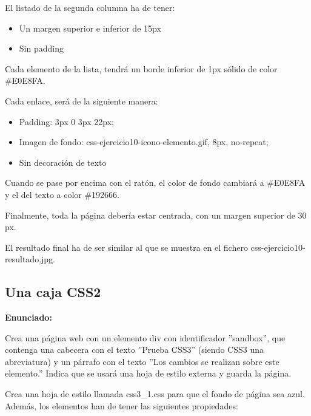 El listado de la segunda columna ha de tener:
\begin{itemize}
  \item Un margen superior e inferior de 15px
  \item Sin padding
\end{itemize}

Cada elemento de la lista, tendrá un borde inferior de 1px sólido de color \#E0E8FA.

Cada enlace, será de la siguiente manera:

\begin{itemize}
  \item Padding: 3px 0 3px 22px;
  \item Imagen de fondo: css-ejercicio10-icono-elemento.gif, 8px, no-repeat;
  \item Sin decoración de texto
\end{itemize}

Cuando se pase por encima con el ratón, el color de fondo cambiará a \#E0E8FA y el del texto a color \#192666.

Finalmente, toda la página debería estar centrada, con un margen superior de 30 px.

El resultado final ha de ser similar al que se muestra en el fichero css-ejercicio10-resultado.jpg.

\subsection{Una caja CSS2}
\label{subsec:caja-css2}

\textbf{Enunciado:}

Crea una página web con un elemento div con identificador ''sandbox'', que contenga una cabecera con el texto ''Prueba CSS3'' (siendo CSS3 una abreviatura) y un párrafo con el texto ''Los cambios se realizan sobre este elemento.'' Indica que se usará una hoja de estilo externa y guarda la página.

Crea una hoja de estilo llamada css3\_1.css para que el fondo de página sea azul. Además, los elementos han de tener las siguientes propiedades:

